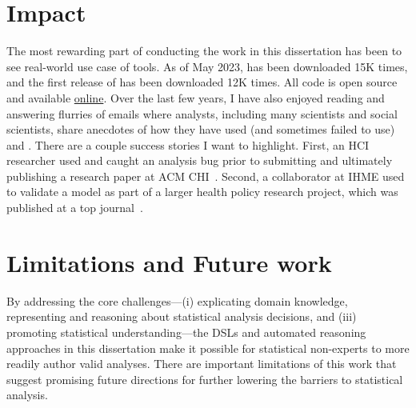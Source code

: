 \section{Impact} \label{sec:impact}
The most rewarding part of conducting the work in this dissertation has been to
see real-world use case of tools. As of May 2023, \tea has been downloaded 15K
times, and the first release of \tisane has been downloaded 12K times. All code
is open source and available \href{https://github.com/tea-lang-org}{online}.
Over the last few years, I have also enjoyed reading and answering flurries of
emails where analysts, including many scientists and social scientists, share
anecdotes of how they have used (and sometimes failed to use) \tea and \tisane.
There are a couple success stories I want to highlight. First, an HCI researcher
used \tisane and caught an analysis bug prior to submitting and ultimately
publishing a research paper at ACM CHI~\cite{baughan2022dissociation}. Second, a
collaborator at IHME used \tisane to validate a model as part of a larger health
policy research project, which was published at a top
journal~\cite{johnson2022varied}.

\section{Limitations and Future work} \label{sec:futureWork}
By addressing the core challenges---(i) explicating domain knowledge,
representing and reasoning about statistical analysis decisions, and (iii)
promoting statistical understanding---the DSLs and automated reasoning
approaches in this dissertation make it possible for statistical non-experts to
more readily author valid analyses. There are important limitations of this work
that suggest promising future directions for further lowering the barriers to
statistical analysis. 

